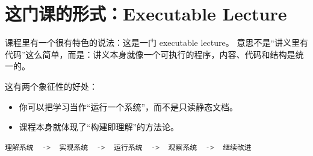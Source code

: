 \section{这门课的形式：Executable Lecture}

课程里有一个很有特色的说法：这是一门 executable lecture。
意思不是“讲义里有代码”这么简单，而是：讲义本身就像一个可执行的程序，内容、代码和结构是统一的。

这有两个象征性的好处：
\begin{itemize}
    \item 你可以把学习当作“运行一个系统”，而不是只读静态文档。
    \item 课程本身就体现了“构建即理解”的方法论。
\end{itemize}

\begin{lstlisting}[language=Python,caption={课程式讲义的概念性示意}]
理解系统  ->  实现系统  ->  运行系统  ->  观察系统  ->  继续改进
\end{lstlisting}

